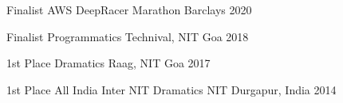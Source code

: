 



\begin{cvhonors}
  \cvhonor
    {Finalist} %
    {AWS DeepRacer Marathon } %
    {Barclays} %
    {2020} %

  \cvhonor
    {Finalist} %
    {Programmatics } %
    {Technival, NIT Goa } %
    {2018} %

  \cvhonor
    {1st Place} %
    {Dramatics}
    {Raag, NIT Goa} %
    {2017} %

  \cvhonor
    {1st Place} %
    {All India Inter NIT Dramatics } %
    {NIT Durgapur, India} %
    {2014} %


\end{cvhonors}







